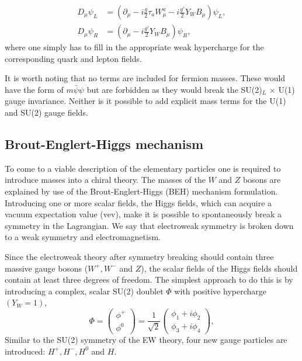 \begin{equation*}
\begin{split}
D_\mu \psi_L &= \left(\partial_\mu - i\frac{g}{2} \tau_a W^a_\mu - i \frac{g'}{2} Y_W B_\mu \right) \psi_L, \\
D_\mu \psi_R &= \left(\partial_\mu - i\frac{g'}{2} Y_W  B_\mu\right)\psi_R,
\end{split}
\end{equation*}
\noindent where one simply has to fill in the appropriate weak hypercharge for the corresponding quark and lepton fields.


It is worth noting that no terms are included for fermion masses. These would have the form of $m\bar{\psi}\psi$ but are forbidden as they would break the SU(2)$_L$ $\times$ U(1) gauge invariance. Neither is it possible to add explicit mass terms for the U(1) and SU(2) gauge fields. 
\subsection{Brout-Englert-Higgs mechanism}
\label{subsec:BEH}
To come to a viable description of the elementary particles one is required to introduce masses into a chiral theory. The masses of the $W$ and $Z$ bosons are explained by use of the Brout-Englert-Higgs (BEH) mechanism formulation. Introducing one or more scalar fields, the Higgs fields, which can acquire a vacuum expectation value (vev), make it is possible to spontaneously break a symmetry in the Lagrangian. We say that electroweak symmetry is broken down to a weak symmetry and electromagnetism. 

Since the electroweak theory after symmetry breaking should contain three massive gauge bosons ($W^+, W^-$ and $Z$), the scalar fields of the Higgs fields should contain at least three degrees of freedom. The simplest approach to do this is by introducing a complex, scalar SU(2) doublet $\Phi$ with positive hypercharge $\left(Y_W=1\right)$,
\begin{equation}
\label{eq:higgsdoublet}
\Phi = \begin{pmatrix} \phi^+ \\ \phi^0 \end{pmatrix} = \frac{1}{\sqrt{2}} \begin{pmatrix} \phi_1 + i\phi_2 \\ \phi_3 + i\phi_4 \end{pmatrix},
\end{equation}
Similar to the SU(2) symmetry of the EW theory, four new gauge particles are introduced: $H^+, H^-, H^0$ and $H$.


